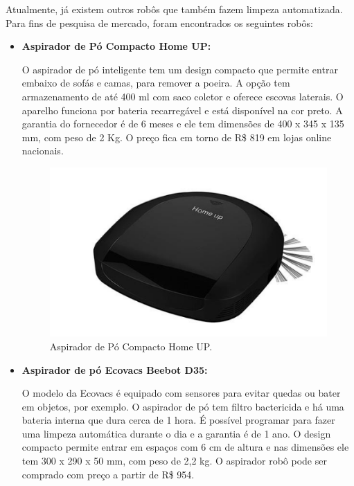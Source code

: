	Atualmente, já existem outros robôs que também fazem limpeza automatizada. Para fins de pesquisa de mercado, foram encontrados os seguintes robôs:

	\begin{itemize}
		\item \textbf{Aspirador de Pó Compacto Home UP:}

			O aspirador de pó inteligente tem um design compacto que permite entrar embaixo de sofás e camas, para remover a poeira. A opção tem armazenamento de até 400 ml com saco coletor e oferece escovas laterais. O aparelho funciona por bateria recarregável e está disponível na cor preto. A garantia do fornecedor é de 6 meses e ele tem dimensões de 400 x 345 x 135 mm, com peso de 2 Kg. O preço fica em torno de R\$ 819 em lojas online nacionais.

			\begin{figure}[H]
				\centering
				\includegraphics[scale=0.55]{figuras/pm_home_up.png}
				\caption{Aspirador de Pó Compacto Home UP.}
				\label{img:pm_home_up}
			\end{figure}

		\item \textbf{Aspirador de pó Ecovacs Beebot D35:}

			 O modelo da Ecovacs é equipado com sensores para evitar quedas ou bater em objetos, por exemplo. O aspirador de pó tem filtro bactericida e há uma bateria interna que dura cerca de 1 hora. É possível programar para fazer uma limpeza automática durante o dia e a garantia é de 1 ano. O design compacto permite entrar em espaços com 6 cm de altura e nas dimensões ele tem 300 x 290 x 50 mm, com peso de 2,2 kg. O aspirador robô pode ser comprado com preço a partir de R\$ 954.


\end{itemize}
